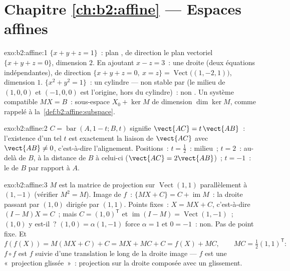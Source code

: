 \section*{Chapitre \ref{ch:b2:affine} --- Espaces affines}

\begin{solution}{exo:b2:affine:1}
$\{x + y + z = 1\}$~: plan , de direction le plan vectoriel $\{x
+ y + z = 0\}$, dimension $2$. En ajoutant $x - z = 3$~: une droite
 (deux équations indépendantes), de direction $\{x + y + z = 0,\
x = z\} = \operatorname{Vect}\bigl((1, -2, 1)\bigr)$, dimension $1$.
$\{x^2 + y^2 = 1\}$~: un cylindre --- non stable par  (le
milieu de $(1,0,0)$ et $(-1,0,0)$ est l'origine, hors du
cylindre)~: non . Un système compatible $MX = B$~: sous-espace
\omterm{def:b2:affine:subspace}{affine} $X_0 + \ker M$ de dimension $\dim\ker M$, comme rappelé
à la~\cref{def:b2:affine:subspace}.
\end{solution}

\begin{solution}{exo:b2:affine:2}
$C = \operatorname{bar}(A, 1-t; B, t)$ signifie $\vect{AC} =
t\,\vect{AB}$~: l'existence d'un tel $t$ est exactement la liaison de
$\vect{AC}$ avec $\vect{AB} \neq 0$, c'est-à-dire l'alignement.
Positions~: $t = \frac12$~: milieu~; $t = 2$~: au-delà de $B$, à la
distance de $B$ à celui-ci ($\vect{AC} = 2\vect{AB}$)~; $t = -1$~: le
\omterm{def:b2:quadratic:adjoint}{symétrique} de $B$ par rapport à $A$.
\end{solution}

\begin{solution}{exo:b2:affine:3}
$M$ est la matrice de projection sur $\operatorname{Vect}(1,1)$
parallèlement à $(1,-1)$ (vérifier $M^2 = M$). Image de $f$~: $\{MX +
C\} = C + \operatorname{im} M$~: la droite  passant par $(1,0)$
dirigée par $(1,1)$. Points fixes~: $X = MX + C$, c'est-à-dire $(I -
M)X = C$~; mais $C = (1, 0)^{\mathsf T}$ et $\operatorname{im}(I - M) =
\operatorname{Vect}(1,-1)$~; $(1,0)$ y est-il~? $(1, 0) =
\alpha(1,-1)$ force $\alpha = 1$ et $0 = -1$~: non. Pas de point fixe.
Et
\[
f(f(X)) = M(MX + C) + C = MX + MC + C = f(X) + MC,
\qquad MC = \tfrac12(1,1)^{\mathsf T} :
\]
$f\circ f$ est $f$ suivie d'une translation le long de la droite image
--- $f$ est une «~projection glissée~»~: projection sur la droite
composée avec un glissement.
\end{solution}

